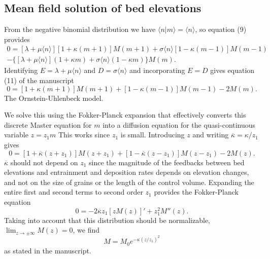 \documentclass[11pt]{article}
\newcommand\be{\begin{equation}} %
\newcommand\ee{\end{equation}}   %
\begin{document}
\subsection{Mean field solution of bed elevations}

From the negative binomial distribution we have $\langle n |m \rangle = \langle n \rangle$, so equation (9) provides 
\begin{multline} 0 = [\lambda + \mu \langle n \rangle][1+\kappa(m+1)]M(m+1) + \sigma \langle n \rangle [1-\kappa(m-1)]M(m-1) \\- \{[\lambda + \mu \langle n \rangle](1+\kappa m) + \sigma \langle n \rangle (1-\kappa m) \}M(m). \end{multline}
Identifying $E=\lambda + \mu \langle n \rangle$ and $D = \sigma \langle n \rangle$ and incorporating $E=D$ gives equation (11) of the manuscript
\be 0 = [1+\kappa(m+1)]M(m+1) + [1-\kappa(m-1)]M(m-1) - 2M(m).\ee
The \citet{Martin2014} Ornstein-Uhlenbeck model. 

We solve this using the Fokker-Planck expansion \citep{Gardiner1983} that effectively converts this discrete Master equation for $m$ into a diffusion equation for the quasi-continuous variable $z=z_1 m$ This works since $z_1$ is small. Introducing $z$ and writing $\overline{\kappa}=\kappa/z_1$ gives
\be 0 = [1+\overline{\kappa}(z+z_1)]M(z+z_1) + [1-\overline{\kappa}(z-z_1)]M(z-z_1) - 2M(z).\ee
$\overline{\kappa}$ should not depend on $z_1$ since the magnitude of the feedbacks between bed elevations and entrainment and deposition rates depends on elevation changes, and not on the size of grains or the length of the control volume.
Expanding the entire first and second terms to second order $z_1$ provides the Fokker-Planck equation
\be 0 = -2\overline{\kappa}z_1[zM(z)]' + z_1^2 M''(z). \ee
Taking into account that this distribution should be normalizable, $\lim_{z\rightarrow \pm \infty}M(z) = 0$, we find
\be M = M_0e^{-\kappa (z/z_1)^2}\ee
as stated in the manuscript.
\end{document}
